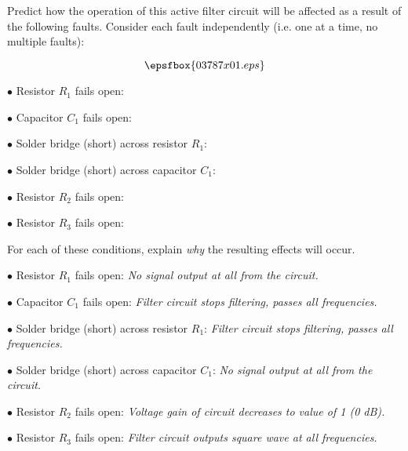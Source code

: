 

Predict how the operation of this active filter circuit will be affected as a result of the following faults.  Consider each fault independently (i.e. one at a time, no multiple faults):

$$\epsfbox{03787x01.eps}$$

\medskip
\item{$\bullet$} Resistor $R_1$ fails open:
\vskip 5pt
\item{$\bullet$} Capacitor $C_1$ fails open:
\vskip 5pt
\item{$\bullet$} Solder bridge (short) across resistor $R_1$:
\vskip 5pt
\item{$\bullet$} Solder bridge (short) across capacitor $C_1$:
\vskip 5pt
\item{$\bullet$} Resistor $R_2$ fails open:
\vskip 5pt
\item{$\bullet$} Resistor $R_3$ fails open:
\medskip

For each of these conditions, explain {\it why} the resulting effects will occur.







\medskip
\item{$\bullet$} Resistor $R_1$ fails open: {\it No signal output at all from the circuit.}
\vskip 5pt
\item{$\bullet$} Capacitor $C_1$ fails open: {\it Filter circuit stops filtering, passes all frequencies.}
\vskip 5pt
\item{$\bullet$} Solder bridge (short) across resistor $R_1$: {\it Filter circuit stops filtering, passes all frequencies.}
\vskip 5pt
\item{$\bullet$} Solder bridge (short) across capacitor $C_1$: {\it No signal output at all from the circuit.}
\vskip 5pt
\item{$\bullet$} Resistor $R_2$ fails open: {\it Voltage gain of circuit decreases to value of 1 (0 dB).}
\vskip 5pt
\item{$\bullet$} Resistor $R_3$ fails open: {\it Filter circuit outputs square wave at all frequencies.}
\medskip






